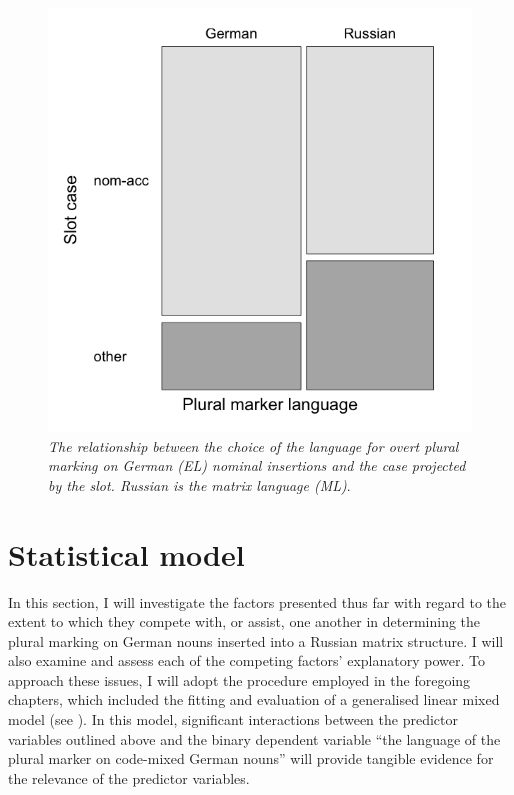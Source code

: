 \begin{figure} %
	\centering
	    	\includegraphics[scale=0.5]{figures/6-Figure_4.png}
	\vspace{2mm}
\caption{\textit{The relationship between the choice of the language for overt plural marking on German (EL) nominal insertions and the case projected by the slot. Russian is the matrix language (ML)}.}\label{fig:6:4}
\end{figure}

\section{Statistical model}\label{stat}

In this section, I will investigate the factors presented thus far with regard to the extent to which they compete with, or assist, one another in determining the plural marking on German nouns inserted into a Russian matrix structure. I will also examine and assess each of the competing factors’ explanatory power. To approach these issues, I will adopt the procedure employed in the foregoing chapters, which included the fitting and evaluation of a generalised linear mixed model (see \citealt[278--284]{baayen-analyzing}). In this model, significant interactions between the predictor variables outlined above and the binary dependent variable “the language of the plural marker on code-mixed German nouns” will provide tangible evidence for the relevance of the predictor variables.

